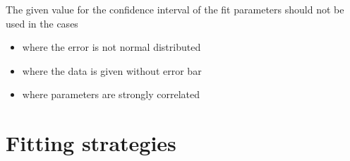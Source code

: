 The given value for the confidence interval of the fit parameters should not be used in the cases
\begin{itemize}
\item where the error is not normal distributed
\item where the data is given without error bar
\item where parameters are strongly correlated
\end{itemize}


\clearpage
\section{Fitting strategies}
